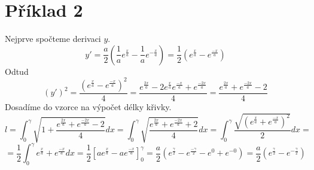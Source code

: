 \documentclass[11pt,a4paper]{article}
\begin{document}
\section*{Příklad 2}
Nejprve spočteme derivaci $y$.
\begin{equation*}
y' = \frac{a}{2}\left(\frac{1}{a} e^\frac{x}{a} - \frac{1}{a} e^{-\frac{x}{a}}\right) = \frac{1}{2} \left(e^\frac{x}{a} - e^\frac{-x}{a}\right)
\end{equation*}
Odtud
\begin{equation*}
(y')^2 = \frac{\left( e^\frac{x}{a} - e^\frac{-x}{a} \right)^2}{4} =
\frac{e^\frac{2x}{a} - 2 e^\frac{x}{a} e^\frac{-x}{a} + e^\frac{-2x}{a}}{4} =
\frac{e^\frac{2x}{a} + e^\frac{-2x}{a} - 2}{4}
\end{equation*}
Dosadíme do vzorce na výpočet délky křivky.
\begin{equation*}
l = \int_0^\gamma \sqrt{1+ \frac{e^\frac{2x}{a} + e^\frac{-2x}{a} - 2}{4}} dx =
\int_0^\gamma \sqrt{\frac{e^\frac{2x}{a} + e^\frac{-2x}{a} + 2}{4}} dx =
\int_0^\gamma \frac{\sqrt{\left( e^\frac{x}{a} + e^\frac{-x}{a} \right)^2 }}{2} dx =
\end{equation*}
\begin{equation*}
= \frac{1}{2} \int_0^\gamma e^\frac{x}{a} + e^\frac{-x}{a} dx = 
\frac{1}{2} \left[ ae^\frac{x}{a} - ae^\frac{-x}{a} \right]_0^\gamma = 
\frac{a}{2} (e^\frac{\gamma}{2} - e^\frac{-\gamma}{2} - e^0 + e^{-0}) =
\frac{a}{2} \left( e^\frac{\gamma}{2} - e^{-\frac{\gamma}{2}} \right)
\end{equation*}
\end{document}
